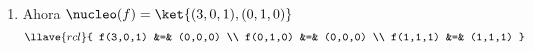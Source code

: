 \begin{enumerate}[label=(\roman*)]
  \item Ahora $\nucleo(f) = \ket{(3,0,1), (0,1,0)}$
        $$
          \llave{rcl}{
            f(3,0,1) &=& (0,0,0) \\
            f(0,1,0) &=& (0,0,0) \\
            f(1,1,1) &=& (1,1,1)
          }
        $$
\end{enumerate}

\begin{aportes}
  \item {}
\end{aportes}
